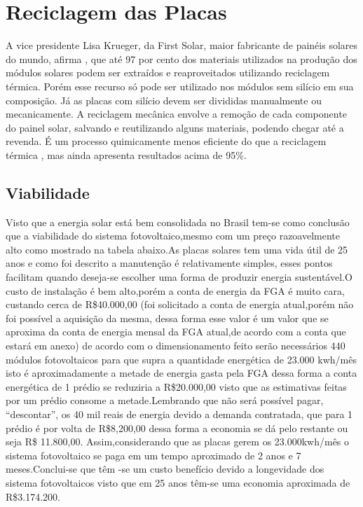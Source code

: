 \section{Reciclagem das Placas}

A vice presidente Lisa Krueger, da First Solar, maior fabricante de painéis solares do mundo, afirma , que até 97 por cento dos materiais utilizados na produção dos módulos solares podem ser extraídos e reaproveitados utilizando reciclagem térmica. Porém esse recurso só pode ser utilizado nos módulos sem silício em sua composição.
Já as placas com silício devem ser divididas manualmente ou mecanicamente. A reciclagem mecânica envolve a remoção de cada componente do painel solar, salvando e reutilizando alguns materiais, podendo chegar até a revenda.  É um processo quimicamente menos eficiente do que a reciclagem térmica , mas ainda apresenta resultados acima de 95\%.

\subsection{Viabilidade}
Visto que a energia solar está bem consolidada no Brasil tem-se como conclusão que a viabilidade do sistema fotovoltaico,mesmo com um preço razoavelmente alto como mostrado na tabela abaixo.As placas solares tem uma vida útil de 25 anos e como foi descrito a manutenção é relativamente simples, esses pontos facilitam quando deseja-se escolher uma forma de produzir energia sustentável.O custo de instalação é bem alto,porém a conta de energia da FGA é muito cara, custando cerca de R\$40.000,00 (foi solicitado a conta de energia atual,porém não foi possível a aquisição da mesma, dessa forma esse valor é um valor que se aproxima da conta de energia mensal da FGA atual,de acordo com a conta que estará em anexo) de acordo com o dimensionamento feito serão necessários 440 módulos fotovoltaicos para que supra a quantidade energética de 23.000 kwh/mês isto é aproximadamente a metade de energia gasta pela FGA dessa forma a conta energética de 1 prédio se reduziria a R\$20.000,00 visto que as estimativas feitas por um prédio consome a metade.Lembrando que não será possível pagar, “descontar”, os 40 mil reais de energia devido a demanda contratada, que para 1 prédio é por volta de R\$8,200,00 dessa forma a economia se dá pelo restante ou seja R\$ 11.800,00. Assim,considerando que as placas gerem os 23.000kwh/mês o sistema fotovoltaico se paga em um tempo aproximado  de 2 anos e 7 meses.Conclui-se que têm -se um custo benefício devido a longevidade dos sistema fotovoltaicos visto que em 25 anos têm-se uma economia aproximada de R\$3.174.200.

